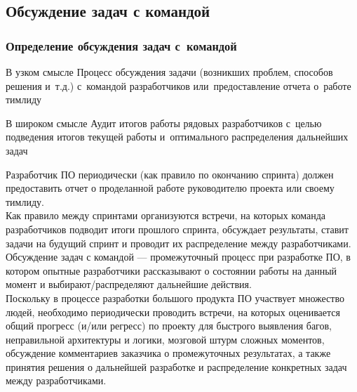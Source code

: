 \documentclass{../industrial-development}
\begin{document}
\subsection{Обсуждение задач с командой}
\begin{frame} \frametitle{Определение обсуждения задач с~командой}
	
	\begin{minipage}{0.46\textwidth}
		\begin{block}{В узком смысле}
			Процесс обсуждения задачи (возникших проблем, способов решения и~т.д.) с~командой разработчиков или~предоставление отчета о~работе тимлиду
		\end{block}
	\end{minipage}
	\hfill
	\begin{minipage}{0.47\textwidth}
		\begin{block}{В широком смысле}
			Аудит итогов работы рядовых разработчиков с~целью подведения итогов текущей работы и~оптимального распределения дальнейших задач
		\end{block}{}
	\end{minipage}
\end{frame}
\lecturenotes
Разработчик ПО периодически (как правило по окончанию спринта) должен предоставить отчет о проделанной работе руководителю проекта или своему тимлиду.\\
Как правило между спринтами организуются встречи, на которых команда разработчиков подводит итоги прошлого спринта, обсуждает результаты, ставит задачи на будущий спринт и проводит их распределение между разработчиками.\\
Обсуждение задач с командой --- промежуточный процесс при разработке ПО, в котором опытные разработчики рассказывают о состоянии работы на данный момент и выбирают/распределяют дальнейшие действия.\\
Поскольку в процессе разработки большого продукта ПО участвует множество людей, необходимо периодически проводить встречи, на которых оценивается общий прогресс (и/или регресс) по проекту для быстрого выявления багов, неправильной архитектуры и логики, мозговой штурм сложных моментов, обсуждение комментариев заказчика о промежуточных результатах, а также принятия решения о дальнейшей разработке и распределение конкретных задач между разработчиками. 
\end{document}
